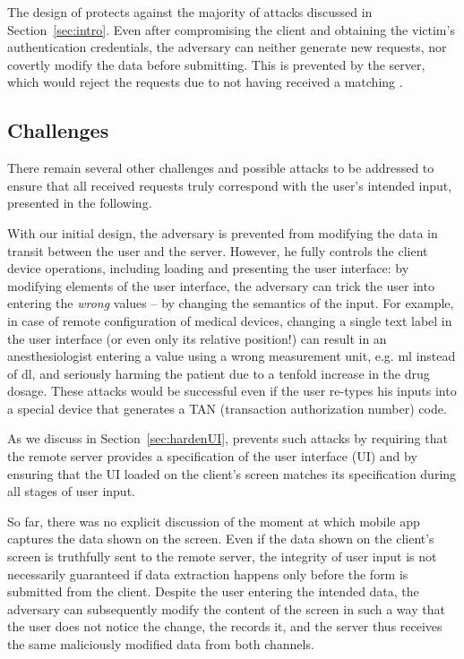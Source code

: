 The design of \sysname protects against the majority of attacks discussed in Section~\ref{sec:intro}.
Even after compromising the client and obtaining the victim's authentication credentials, the adversary can neither generate new requests, nor covertly modify the data before submitting.
This is prevented by the server, which would reject the requests due to not having received a matching \POI.


\subsection{Challenges}
\label{integriscreen:sec:systemDesign:challenger}

There remain several other challenges and possible attacks to be addressed to ensure that all received requests truly correspond with the user's intended input, presented in the following.

With our initial design, the adversary is prevented from modifying the data in transit between the user and the server.
However, he fully controls the client device operations, including loading and presenting the user interface: by modifying elements of the user interface, the adversary can trick the user into entering the \textit{wrong} values -- by changing the semantics of the input.
For example, in case of remote configuration of medical devices, changing a single text label in the user interface (or even only its relative position!) can result in an anesthesiologist entering a value using a wrong measurement unit, e.g. ml instead of dl, and seriously harming the patient due to a tenfold increase in the drug dosage.
These attacks would be successful even if the user re-types his inputs into a special device that generates a TAN (transaction authorization number) code.

As we discuss in Section~\ref{sec:hardenUI}, \sysname prevents such attacks by requiring that the remote server provides a specification of the user interface (UI) and by ensuring that the UI loaded on the client's screen matches its specification during all stages of user input.


So far, there was no explicit discussion of the moment at which mobile app captures the data shown on the screen.
Even if the data shown on the client's screen is truthfully sent to the remote server, the integrity of user input is not necessarily guaranteed if data extraction happens only before the form is submitted from the client.
Despite the user entering the intended data, the adversary can subsequently modify the content of the screen in such a way that the user does not notice the change, the \app records it, and the server thus receives the same maliciously modified data from both channels.

